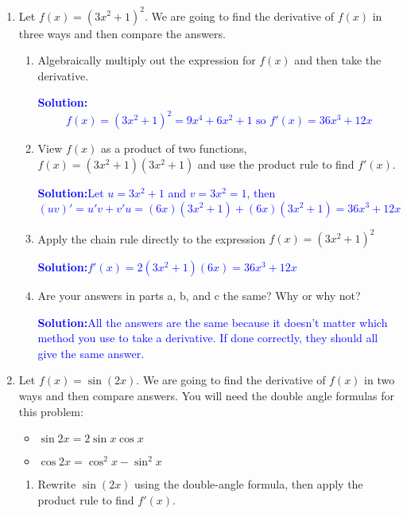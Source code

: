 \documentclass[letterpaper,11pt]{article}
\newcommand{\sol}[2]{\begin{minipage}[c][#1]{\linewidth}{\textcolor{blue}{\textbf{Solution:}}\quad \textcolor{blue}{#2}}\end{minipage}}
\newcommand{\sol}[2]{\begin{minipage}[c][#1]{\linewidth}{\vfill}\end{minipage}}
\begin{document}
\chead{}

\begin{enumerate}

\item Let $f(x)=(3x^2+1)^2$. We are going to find the derivative of $f(x)$ in three ways and then compare the answers.

\begin{enumerate}
\item Algebraically multiply out the expression for $f(x)$ and then take the derivative.

\sol{1.5in}{\[f(x)=(3x^2+1)^2=9x^4+6x^2+1 \text{ so } f'(x)=36x^3+12x\]}

\item View $f(x)$ as a product of two functions, $f(x)=(3x^2+1)(3x^2+1)$ and use the product rule to find $f'(x)$.

\sol{1.5 in}{Let $u=3x^2+1$ and $v=3x^2=1$, then $(uv)'=u'v+v'u=(6x)(3x^2+1)+(6x)(3x^2+1)=36x^3+12x$}

\item Apply the chain rule directly to the expression $f(x)=(3x^2+1)^2$

\sol{1.5 in}{$f'(x)=2(3x^2+1)(6x)=36x^3+12x$}

\item Are your answers in parts a, b, and c the same? Why or why not?

\sol{1.5 in}{All the answers are the same because it doesn't matter which method you use to take a derivative. If done correctly, they should all give the same answer.}

\end{enumerate}

\newpage

\item Let $f(x)=\sin(2x).$ We are going to find the derivative of $f(x)$ in two ways and then compare answers.  You will need the double angle formulas for this problem:
\begin{itemize}
\item $\sin{2x}=2\sin{x}\cos{x}$
\item $\cos{2x}=\cos^2{x}-\sin^2{x}$

\end{itemize}

\begin{enumerate}
\item Rewrite $\sin(2x)$ using the double-angle formula, then apply the product rule to find $f'(x)$.


\end{enumerate}
\end{enumerate}
\end{document}
